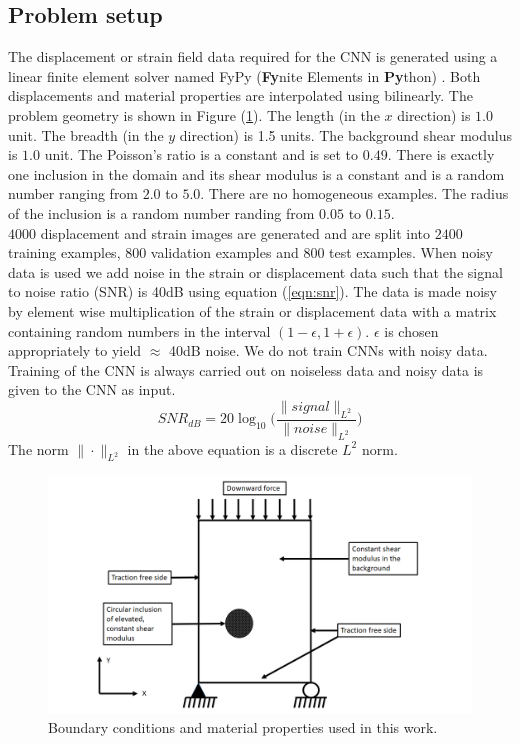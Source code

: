 \documentclass[12pt]{article}
\begin{document}
\subsection{\label{sect:probsetup}Problem setup}
The displacement or strain field data required for the CNN is generated using a linear finite element solver named FyPy (\textbf{Fy}nite Elements in \textbf{Py}thon) \cite{misc:fypy}. Both displacements and material properties are interpolated using bilinearly. The problem geometry is shown in Figure (\ref{fig:bc}). The length (in the $x$ direction) is $1.0$ unit. The breadth (in the $y$ direction) is 1.5 units. The background shear modulus is $1.0$ unit. The Poisson's ratio is a constant and is set to $0.49$. There is exactly one inclusion in the domain and its shear modulus is a constant and is a random number ranging from $2.0$ to $5.0$. There are no homogeneous examples. The radius of the inclusion is a random number randing from $0.05$ to $0.15$.\\
$4000$ displacement and strain images are generated and are split into $2400$ training examples, $800$ validation examples and $800$ test examples. When noisy data is used we add noise in the strain or displacement data such that the signal to noise ratio (SNR) is 40dB using equation (\ref{eqn:snr}). The data is made noisy by element wise multiplication of the strain or displacement data with a matrix containing random numbers in the interval $(1-\epsilon,1+\epsilon)$. $\epsilon$ is chosen appropriately to yield $\approx$ 40dB noise. We do not train CNNs with noisy data. Training of the CNN is always carried out on noiseless data and noisy data is given to the CNN as input. 
\begin{equation}
  \label{eqn:snr}
  SNR_{dB} = 20\log_{10}\Big(\frac{\|signal\|_{L^2}}{\|noise\|_{L^2}}\Big)
\end{equation}
The norm $\|\cdot\|_{L^2}$ in the above equation is a discrete $L^2$ norm. 
%
\begin{figure} 
   \centering
    \includegraphics[totalheight=9cm]{Figures/bc.png}
  \caption{\label{fig:bc}Boundary conditions and material properties used in this work. }
\end{figure}
%
\end{document}
